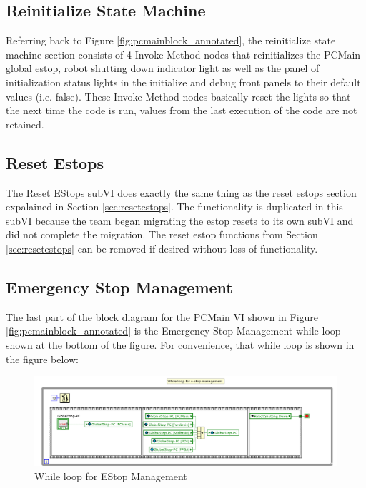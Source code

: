 \subsection{Reinitialize State Machine}

Referring back to Figure \ref{fig:pcmainblock_annotated}, the reinitialize state machine section consists of 4 Invoke Method nodes that reinitializes the PCMain global estop, robot shutting down indicator light as well as the panel of initialization status lights in the initialize and debug front panels to their default values (i.e. false). These Invoke Method nodes basically reset the lights so that the next time the code is run, values from the last execution of the code are not retained. 


\subsection{Reset Estops}

The Reset EStops subVI does exactly the same thing as the reset estops section expalained in Section \ref{sec:resetestops}. The functionality is duplicated in this subVI because the team began migrating the estop resets to its own subVI and did not complete the migration. The reset estop functions from Section \ref{sec:resetestops} can be removed if desired without loss of functionality.

\subsection{Emergency Stop Management}

The last part of the block diagram for the PCMain VI shown in Figure \ref{fig:pcmainblock_annotated} is the Emergency Stop Management while loop shown at the bottom of the figure. For convenience, that while loop is shown in the figure below:

\begin{figure}[h!]
\centering
\includegraphics[scale=0.85]{Photos/estopmanagement.png}
\caption{While loop for EStop Management}
\label{fig:estopmanagement}
\end{figure}

